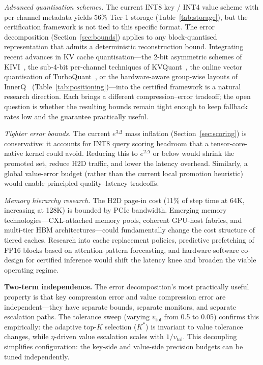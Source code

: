 \documentclass[10pt,twocolumn,a4paper]{article}
\theoremstyle{definition}
\theoremstyle{remark}
\begin{document}
\emph{Advanced quantisation schemes.}  The current INT8 key / INT4 value scheme with per-channel metadata yields 56\% Tier-1 storage (Table~\ref{tab:storage}), but the certification framework is not tied to this specific format.  The error decomposition (Section~\ref{sec:bounds}) applies to any block-quantised representation that admits a deterministic reconstruction bound.  Integrating recent advances in KV cache quantisation---the 2-bit asymmetric schemes of KIVI~\cite{kivi}, the sub-4-bit per-channel techniques of KVQuant~\cite{kvquant}, the online vector quantisation of TurboQuant~\cite{turboquant}, or the hardware-aware group-wise layouts of InnerQ~\cite{innerq} (Table~\ref{tab:positioning})---into the certified framework is a natural research direction.  Each brings a different compression--error tradeoff; the open question is whether the resulting bounds remain tight enough to keep fallback rates low and the guarantee practically useful.

\emph{Tighter error bounds.}  The current $e^{3\Delta}$ mass inflation (Section~\ref{sec:scoring}) is conservative: it accounts for INT8 query scoring headroom that a tensor-core-native kernel could avoid.  Reducing this to $e^{2\Delta}$ or below would shrink the promoted set, reduce H2D traffic, and lower the latency overhead.  Similarly, a global value-error budget (rather than the current local promotion heuristic) would enable principled quality--latency tradeoffs.

\emph{Memory hierarchy research.}  The H2D page-in cost (11\% of step time at 64K, increasing at 128K) is bounded by PCIe bandwidth.  Emerging memory technologies---CXL-attached memory pools, coherent GPU-host fabrics, and multi-tier HBM architectures---could fundamentally change the cost structure of tiered caches.  Research into cache replacement policies, predictive prefetching of FP16 blocks based on attention-pattern forecasting, and hardware-software co-design for certified inference would shift the latency knee and broaden the viable operating regime.

\textbf{Two-term independence.}  The error decomposition's most practically useful property is that key compression error and value compression error are independent---they have separate bounds, separate monitors, and separate escalation paths.  The tolerance sweep (varying $v_{\mathrm{tol}}$ from 0.5 to 0.05) confirms this empirically: the adaptive top-$K$ selection ($K^*$) is invariant to value tolerance changes, while $\eta$-driven value escalation scales with $1/v_{\mathrm{tol}}$.  This decoupling simplifies configuration: the key-side and value-side precision budgets can be tuned independently.
\end{document}
